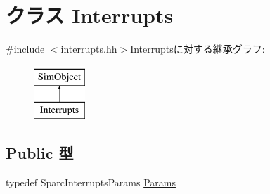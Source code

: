 \hypertarget{classSparcISA_1_1Interrupts}{
\section{クラス Interrupts}
\label{classSparcISA_1_1Interrupts}
}


{\ttfamily \#include $<$interrupts.hh$>$}Interruptsに対する継承グラフ:\begin{figure}[H]
\begin{center}
\leavevmode
\includegraphics[height=2cm]{classSparcISA_1_1Interrupts}
\end{center}
\end{figure}
\subsection*{Public 型}
\begin{DoxyCompactItemize}
\item 
typedef SparcInterruptsParams \hyperlink{classSparcISA_1_1Interrupts_a1480e28e439219daadcc82008890f5d7}{Params}
\end{DoxyCompactItemize}
